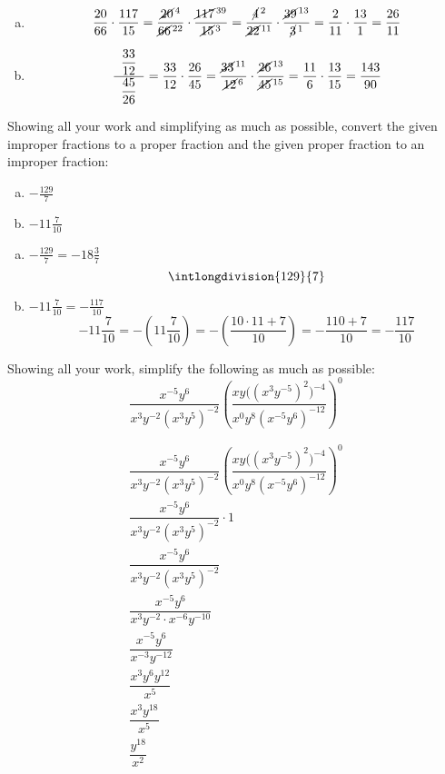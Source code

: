 \documentclass[12pt,letterpaper]{exam}
\begin{document}
\begin{questions}
\sol 
\begin{enumerate}[(a)]
\item 
	\[
	\dfrac{20}{66} \cdot \dfrac{117}{15}= \dfrac{\cancel{20}^{\,4}}{\cancel{66}^{\,22}} \cdot \dfrac{\cancel{117}^{\,39}}{\cancel{15}^{\,3}}= \dfrac{\cancel{4}^{\,2}}{\cancel{22}^{\,11}} \cdot \dfrac{\cancel{39}^{\,13}}{\cancel{3}^{\,1}}= \dfrac{2}{11} \cdot \dfrac{13}{1}= \dfrac{26}{11}
	\] \pspace

\item 
	\[
	\dfrac{\;\;\dfrac{33}{12}\;\;}{\;\;\dfrac{45}{26}\;\;}= \dfrac{33}{12} \cdot \dfrac{26}{45}= \dfrac{\cancel{33}^{\,11}}{\cancel{12}^{\,6}} \cdot \dfrac{\cancel{26}^{\,13}}{\cancel{45}^{\,15}}= \dfrac{11}{6} \cdot \dfrac{13}{15}= \dfrac{143}{90}
	\]
\end{enumerate}



\newpage
\question[5] Showing all your work and simplifying as much as possible, convert the given improper fractions to a proper fraction and the given proper fraction to an improper fraction:
	\begin{enumerate}[(a)]
	\item $-\frac{129}{7}$
	\item $-11 \frac{7}{10}$
	\end{enumerate} \pspace

\sol 
\begin{enumerate}[(a)]
\item $-\frac{129}{7}= -18 \frac{3}{7}$
	\[
	\intlongdivision{129}{7} %
	\] \pspace

\item $-11 \frac{7}{10}= -\frac{117}{10}$ \pspace
	\[
	-11 \frac{7}{10}= -\left( 11 \frac{7}{10} \right)= - \left( \dfrac{10 \cdot 11 + 7}{10} \right)= -\dfrac{110 + 7}{10}= -\dfrac{117}{10}
	\]
\end{enumerate}



\newpage
\question[5] Showing all your work, simplify the following as much as possible: 
	\[
	\dfrac{x^{-5} y^6}{x^3 y^{-2} (x^3 y^5)^{-2}} \left( \dfrac{xy \big( (x^3 y^{-5})^2 \big)^{-4}}{x^0 y^8 (x^{-5} y^6)^{-12}} \right)^0
	\] \pspace

\sol 
	\[
	\begin{gathered}
	\dfrac{x^{-5} y^6}{x^3 y^{-2} (x^3 y^5)^{-2}} \left( \dfrac{xy \big( (x^3 y^{-5})^2 \big)^{-4}}{x^0 y^8 (x^{-5} y^6)^{-12}} \right)^0 \\[0.3cm]
	\dfrac{x^{-5} y^6}{x^3 y^{-2} (x^3 y^5)^{-2}} \cdot 1 \\[0.3cm]
	\dfrac{x^{-5} y^6}{x^3 y^{-2} (x^3 y^5)^{-2}} \\[0.3cm]
	\dfrac{x^{-5} y^6}{x^3 y^{-2} \cdot x^{-6} y^{-10}} \\[0.3cm]
	\dfrac{x^{-5} y^6}{x^{-3} y^{-12}} \\[0.3cm]
	\dfrac{x^3 y^6 y^{12}}{x^5} \\[0.3cm]
	\dfrac{x^3 y^{18}}{x^5} \\[0.3cm]
	\dfrac{y^{18}}{x^2}
	\end{gathered}
	\]




\end{questions}
\end{document}
